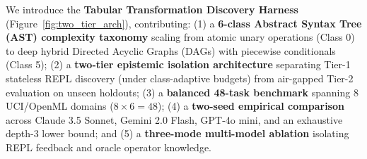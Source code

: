 \documentclass[sigconf]{acmart}
\begin{document}
We introduce the \textbf{Tabular Transformation Discovery Harness} (Figure~\ref{fig:two_tier_arch}), contributing: (1) a \textbf{6-class Abstract Syntax Tree (AST) complexity taxonomy} scaling from atomic unary operations (Class 0) to deep hybrid Directed Acyclic Graphs (DAGs) with piecewise conditionals (Class 5); (2) a \textbf{two-tier epistemic isolation architecture} separating Tier-1 stateless REPL discovery (under class-adaptive budgets) from air-gapped Tier-2 evaluation on unseen holdouts; (3) a \textbf{balanced 48-task benchmark} spanning 8 UCI/OpenML domains ($8 \times 6 = 48$); (4) a \textbf{two-seed empirical comparison} across Claude 3.5 Sonnet, Gemini 2.0 Flash, GPT-4o mini, and an exhaustive depth-3 lower bound; and (5) a \textbf{three-mode multi-model ablation} isolating REPL feedback and oracle operator knowledge.
\end{document}
